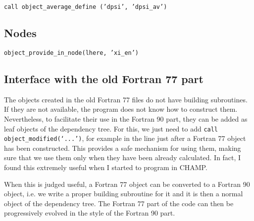 \documentclass[a4paper,11pt]{article}
\begin{document}
\vspace{0.5cm}
\noindent
{\tt call object\_average\_define ('dpsi', 'dpsi\_av')}


\subsection{Nodes}

\vspace{0.5cm}
\noindent
{\tt object\_provide\_in\_node(lhere, 'xi\_en')}


\subsection{Interface with the old Fortran 77 part}

The objects created in the old Fortran 77 files do not have building subroutines. If they are not available, the program does not know how to construct them. Nevertheless, to facilitate their use in the Fortran 90 part, they can be added as leaf objects of the dependency tree. For this, we just need to add {\tt call object\_modified(`...')}, for example in the line just after a Fortran 77 object has been constructed. This provides a safe mechanism for using them, making sure that we use them only when they have been already calculated. In fact, I found this extremely useful when I started to program in CHAMP. 

When this is judged useful, a Fortran 77 object can be converted to a Fortran 90 object, i.e. we write a proper building subroutine for it and it is then a normal object of the dependency tree. The Fortran 77 part of the code can then be progressively evolved in the style of the Fortran 90 part.



{}


\end{document}

